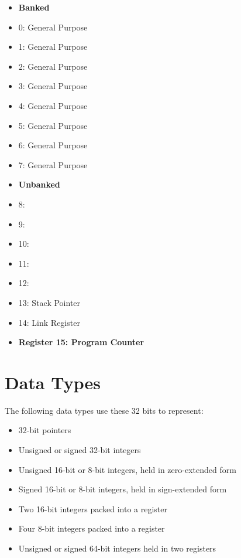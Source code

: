 \documentclass[12pt]{scrreprt}
\begin{document}
	\begin{itemize}	
		\item{\bfseries Banked}
		\item{0: General Purpose}
		\item{1: General Purpose}
		\item{2: General Purpose}
		\item{3: General Purpose}
		\item{4: General Purpose}
		\item{5: General Purpose}
		\item{6: General Purpose}
		\item{7: General Purpose}
		\item{\bfseries Unbanked}
		\item{8: }
		\item{9: }
		\item{10: }
		\item{11: }
		\item{12: }
		\item{13: Stack Pointer}
		\item{14: Link Register}
		\item{\bfseries Register 15: Program Counter}
	\end{itemize}


{\let\clearpage\relax\chapter{Data Types}}


	The following data types use these 32 bits to represent:

	\begin{itemize}
		\item{32-bit pointers}
		\item{Unsigned or signed 32-bit integers}
		\item{Unsigned 16-bit or 8-bit integers, held in zero-extended form}
		\item{Signed 16-bit or 8-bit integers, held in sign-extended form}
		\item{Two 16-bit integers packed into a register}
		\item{Four 8-bit integers packed into a register}
		\item{Unsigned or signed 64-bit integers held in two registers}
	\end{itemize}
\end{document}
